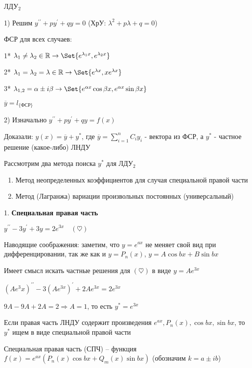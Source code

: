 \documentclass[12pt]{article}
\begin{document}
    \Mem ЛДУ$_2$

    1) Решим $y^{\prime\prime} + py^\prime + qy = 0$ (ХрУ: $\lambda^2 + p \lambda + q = 0$)

    ФСР для всех случаев:

    1* $\lambda_1 \neq \lambda_2 \in \Real \to \Set{e^{\lambda_1 x}, e^{\lambda_2 x}}$

    2* $\lambda_1 = \lambda_2 = \lambda \in \Real \to \Set{e^{\lambda x}, xe^{\lambda x}}$

    3* $\lambda_{1,2} = \alpha \pm i \beta \to \Set{e^{\alpha x} \cos \beta x, e^{\alpha x} \sin \beta x}$

    $\overline{y} = l_{\{\text{ФСР}\}}$

    2) Изначально $y^{\prime\prime} + py^\prime + qy = f(x)$

    Доказали: $y(x) = \overline{y} + y^*$, где $\overline{y} = \sum_{i=1}^n C_i y_i$ - вектора из ФСР, а $y^*$ - частное решение (какое-либо) ЛНДУ

    \Nota Рассмотрим два метода поиска $y^*$ для ЛДУ$_2$

    \begin{enumerate}
        \item Метод неопределенных коэффициентов для случая специальной правой части

        \item Метод (Лагранжа) вариации произвольных постоянных (универсальный)
    \end{enumerate}

    \mediumvspace

    1. \textbf{Специальная правая часть}

    \Ex $y^{\prime\prime} - 3y^\prime + 3y = 2e^{3x} \quad (\heartsuit)$

    Наводящие соображения: заметим, что $y = e^{ax}$ не меняет свой вид при дифференцировании,
    так же как и $y = P_n(x)$, $y = A\cos bx + B\sin bx$

    Имеет смысл искать частные решения для $(\heartsuit)$ в виде $y = Ae^{3x}$

    $(Ae^3x)^{\prime\prime} - 3(Ae^{3x})^\prime + 2Ae^{3x} = 2e^{3x}$

    $9A - 9A + 2A = 2 \Longrightarrow A = 1$, то есть $y^* = e^{3x}$

    \Nota Если правая часть ЛНДУ содержит произведения $e^{ax}, P_n(x), \cos bx, \sin bx$, то $y^*$ ищем в виде специальной правой части

    \Def Специальная правая часть (СПЧ) -- функция $f(x) = e^{ax} (P_n(x)\cos bx + Q_m (x)\sin bx)$ (обозначим $k = a \pm ib$)
\end{document}
